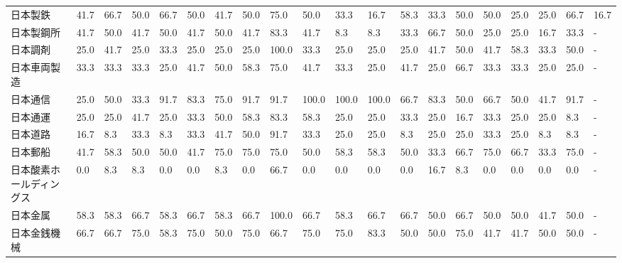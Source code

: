 \begin{tabular}{llllllllllllllllllll}
日本製鉄            &   41.7 &   66.7 &      50.0 &      66.7 &       50.0 &   41.7 &   50.0 &   75.0 &    50.0 &    33.3 &   16.7 &  58.3 &   33.3 &    50.0 &    50.0 &  25.0 &  25.0 &  66.7 &  16.7 \\
日本製鋼所           &   41.7 &   50.0 &      41.7 &      50.0 &       41.7 &   50.0 &   41.7 &   83.3 &    41.7 &     8.3 &    8.3 &  33.3 &   66.7 &    50.0 &    25.0 &  25.0 &  16.7 &  33.3 &     - \\
日本調剤            &   25.0 &   41.7 &      25.0 &      33.3 &       25.0 &   25.0 &   25.0 &  100.0 &    33.3 &    25.0 &   25.0 &  25.0 &   41.7 &    50.0 &    41.7 &  58.3 &  33.3 &  50.0 &     - \\
日本車両製造          &   33.3 &   33.3 &      33.3 &      25.0 &       41.7 &   50.0 &   58.3 &   75.0 &    41.7 &    33.3 &   25.0 &  41.7 &   25.0 &    66.7 &    33.3 &  33.3 &  25.0 &  25.0 &     - \\
日本通信            &   25.0 &   50.0 &      33.3 &      91.7 &       83.3 &   75.0 &   91.7 &   91.7 &   100.0 &   100.0 &  100.0 &  66.7 &   83.3 &    50.0 &    66.7 &  50.0 &  41.7 &  91.7 &     - \\
日本通運            &   25.0 &   25.0 &      41.7 &      25.0 &       33.3 &   50.0 &   58.3 &   83.3 &    58.3 &    25.0 &   25.0 &  33.3 &   25.0 &    16.7 &    33.3 &  25.0 &  25.0 &   8.3 &     - \\
日本道路            &   16.7 &    8.3 &      33.3 &       8.3 &       33.3 &   41.7 &   50.0 &   91.7 &    33.3 &    25.0 &   25.0 &   8.3 &   25.0 &    25.0 &    33.3 &  25.0 &   8.3 &   8.3 &     - \\
日本郵船            &   41.7 &   58.3 &      50.0 &      50.0 &       41.7 &   75.0 &   75.0 &   75.0 &    50.0 &    58.3 &   58.3 &  50.0 &   33.3 &    66.7 &    75.0 &  66.7 &  33.3 &  75.0 &     - \\
日本酸素ホールディングス    &    0.0 &    8.3 &       8.3 &       0.0 &        0.0 &    8.3 &    0.0 &   66.7 &     0.0 &     0.0 &    0.0 &   0.0 &   16.7 &     8.3 &     0.0 &   0.0 &   0.0 &   0.0 &     - \\
日本金属            &   58.3 &   58.3 &      66.7 &      58.3 &       66.7 &   58.3 &   66.7 &  100.0 &    66.7 &    58.3 &   66.7 &  66.7 &   50.0 &    66.7 &    50.0 &  50.0 &  41.7 &  50.0 &     - \\
日本金銭機械          &   66.7 &   66.7 &      75.0 &      58.3 &       75.0 &   50.0 &   75.0 &   66.7 &    75.0 &    75.0 &   83.3 &  50.0 &   50.0 &    75.0 &    41.7 &  41.7 &  50.0 &  50.0 &     - \\

\end{tabular}
